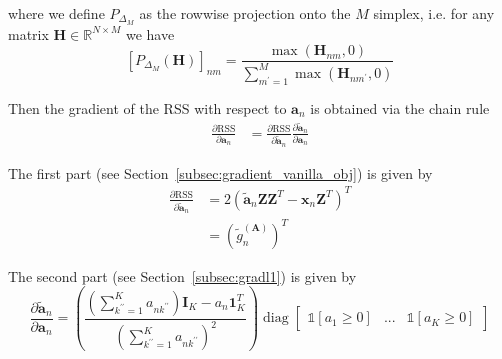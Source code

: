 \documentclass{article}
\begin{document}
where we define $P_{\Delta_M}$ as the rowwise projection onto the $M$ simplex, i.e. for any matrix $\mathbf{H} \in \mathbb{R}^{N \times M}$ we have
\begin{equation}
    \left[ P_{\Delta_M}(\mathbf{H}) \right]_{nm} = \frac{\max(\mathbf{H}_{nm},0)}{\sum_{m^\prime=1}^M \max(\mathbf{H}_{nm^\prime}, 0)}
\end{equation}

Then the gradient of the RSS with respect to $\mathbf{a}_{n}$ is obtained via the chain rule
\begin{equation}
    \begin{aligned}
        \frac{\partial \text{RSS}}{\partial \mathbf{a}_{n}} &= \frac{\partial \text{RSS}}{\partial \tilde{\mathbf{a}}_n} \frac{\partial \tilde{\mathbf{a}}_n}{\partial \mathbf{a}_n}
    \end{aligned}
\end{equation}

The first part (see Section~\ref{subsec:gradient_vanilla_obj}) is given by
\begin{equation}
    \begin{aligned}
        \frac{\partial \text{RSS}}{\partial \tilde{\mathbf{a}}_n}
        &= 2 \left( \tilde{\mathbf{a}}_n \mathbf{Z} \mathbf{Z}^T - \mathbf{x}_n \mathbf{Z}^T \right)^T \\
        &= \left( \tilde{g}^{(\mathbf{A})}_n \right)^T
    \end{aligned}
\end{equation}

The second part (see Section~\ref{subsec:gradl1}) is given by
\begin{equation}
    \frac{\partial  \tilde{\mathbf{a}}_n}{\partial \mathbf{a}_{n}} = \left( \frac{\left( \sum_{k^{\prime \prime}=1}^K a_{nk^{\prime \prime}} \right) \mathbf{I}_K - a_n \mathbf{1}_K^T}{\left( \sum_{k^{\prime \prime}=1}^K a_{nk^{\prime \prime}} \right)^2} \right)
    \operatorname{diag} \begin{bmatrix} \mathds{1} \left[ a_1 \geq 0 \right] & ... & \mathds{1} \left[ a_K \geq 0 \right] \end{bmatrix}
\end{equation}
\end{document}
